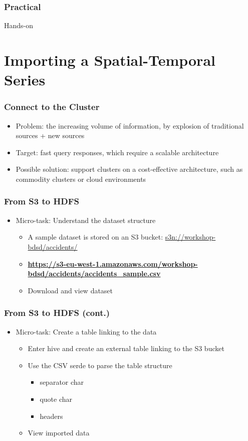 \documentclass[hyperref={pdfpagelabels=true}]{beamer}
\begin{document}
\begin{frame}
\frametitle{Practical}
  \huge{Hands-on}
\end{frame}


\section{Importing a Spatial-Temporal Series} 

\begin{frame}
\frametitle{Connect to the Cluster}
  \begin{itemize}
  \item<1->Problem: the increasing volume of information, by explosion of traditional sources + new sources
  \item<1->Target: fast query responses, which require a scalable architecture
  \item<1->Possible solution: support clusters on a cost-effective architecture, such as commodity clusters or cloud environments
\end{itemize}  
\end{frame}

\begin{frame}
\frametitle{From S3 to HDFS}
\begin{itemize}
  \item<1->Micro-task: Understand the dataset structure
  \begin{itemize}
    \item<1->A sample dataset is stored on an S3 bucket: \url{s3n://workshop-bdsd/accidents/}
    \item<2->\textbf{\url{https://s3-eu-west-1.amazonaws.com/workshop-bdsd/accidents/accidents\_sample.csv}}
    \item<3->Download and view dataset
  \end{itemize}
\end{itemize}
\end{frame}

\begin{frame}
\frametitle{From S3 to HDFS (cont.)}
\begin{itemize}
  \item<1->Micro-task: Create a table linking to the data
  \begin{itemize}
    \item<1->Enter hive and create an external table linking to the S3 bucket
    \item<2->Use the CSV serde to parse the table structure
      \begin{itemize}
	\item<3->separator char
	\item<3->quote char
	\item<3->headers
       \end{itemize}
    \item<4->View imported data       
  \end{itemize}
\end{itemize}
\end{frame}
\end{document}
